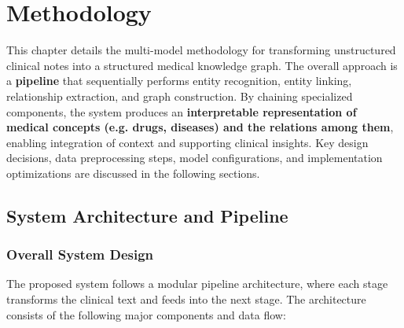 
\chapter{Methodology} %

\label{Chapter3} %


This chapter details the multi-model methodology for transforming unstructured clinical notes into a structured medical knowledge graph. The overall approach is a \textbf{pipeline} that sequentially performs entity recognition, entity linking, relationship extraction, and graph construction. By chaining specialized components, the system produces an \textbf{interpretable representation of medical concepts (e.g. drugs, diseases) and the relations among them}, enabling integration of context and supporting clinical insights. Key design decisions, data preprocessing steps, model configurations, and implementation optimizations are discussed in the following sections.

\section{System Architecture and Pipeline}

\subsection{Overall System Design}

The proposed system follows a modular pipeline architecture, where each stage transforms the clinical text and feeds into the next stage. The architecture consists of the following major components and data flow:

